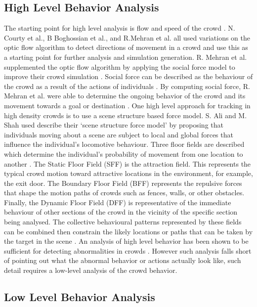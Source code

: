 \documentclass[12pt, twocolumn, conference]{IEEEtran}
\begin{document}
\subsection{High Level Behavior Analysis}

The starting point for high level analysis is flow and speed of the crowd \cite{N. Courty}\cite{B. Boghossian}\cite{R. Mehran}. N. Courty et al., B Boghossian et al., and R.Mehran et al. all used variations on the optic flow algorithm to detect directions of movement in a crowd and use this as a starting point for further analysis and simulation generation. R. Mehran et al. supplemented the optic flow algorithm by applying the social force model to improve their crowd simulation \cite{R. Mehran}. Social force can be described as the behaviour of the crowd as a result of the actions of individuals \cite{R. Mehran}. By computing social force, R. Mehran et al. were able to determine the ongoing behavior of the crowd and its movement towards a goal or destination \cite{R. Mehran}. 
One high level approach for tracking in high density crowds is to use a scene structure based force model\cite{S. Ali}. S. Ali and M. Shah used describe their ‘scene structure force model’ by proposing that individuals moving about a scene are subject to local and global forces that influence the individual’s locomotive behaviour. Three floor fields are described which determine the individual’s probability of movement from one location to another \cite{S. Ali}. The Static Floor Field (SFF) is the attraction field. This represents the typical crowd motion toward attractive locations in the environment, for example, the exit door. The Boundary Floor Field (BFF) represents the repulsive forces that shape the motion paths of crowds such as fences, walls, or other obstacles. Finally, the Dynamic Floor Field (DFF) is representative of the immediate behaviour of other sections of the crowd in the vicinity of the specific section being analysed. The collective behavioural patterns represented by these fields can be combined then constrain the likely locations or paths that can be taken by the target in the scene \cite{S. Ali}. 
An analysis of high level behavior has been shown to be sufficient for detecting abnormalities in crowds \cite{R. Mehran}\cite{F. Zhao}. However such analysis falls short of pointing out what the abnormal behavior or actions actually look like, such detail requires a low-level analysis of the crowd behavior.

\subsection{Low Level Behavior Analysis}
\end{document}
